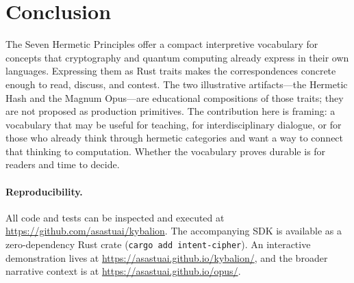 \documentclass[sigplan,anonymous=false]{acmart}
\begin{document}
\section{Conclusion}

The Seven Hermetic Principles offer a compact interpretive vocabulary for concepts that cryptography and quantum computing already express in their own languages. Expressing them as Rust traits makes the correspondences concrete enough to read, discuss, and contest. The two illustrative artifacts---the Hermetic Hash and the Magnum Opus---are educational compositions of those traits; they are not proposed as production primitives. The contribution here is framing: a vocabulary that may be useful for teaching, for interdisciplinary dialogue, or for those who already think through hermetic categories and want a way to connect that thinking to computation. Whether the vocabulary proves durable is for readers and time to decide.

\paragraph{Reproducibility.} All code and tests can be inspected and executed at \url{https://github.com/asastuai/kybalion}. The accompanying SDK is available as a zero-dependency Rust crate (\texttt{cargo add intent-cipher}). An interactive demonstration lives at \url{https://asastuai.github.io/kybalion/}, and the broader narrative context is at \url{https://asastuai.github.io/opus/}.
\end{document}
